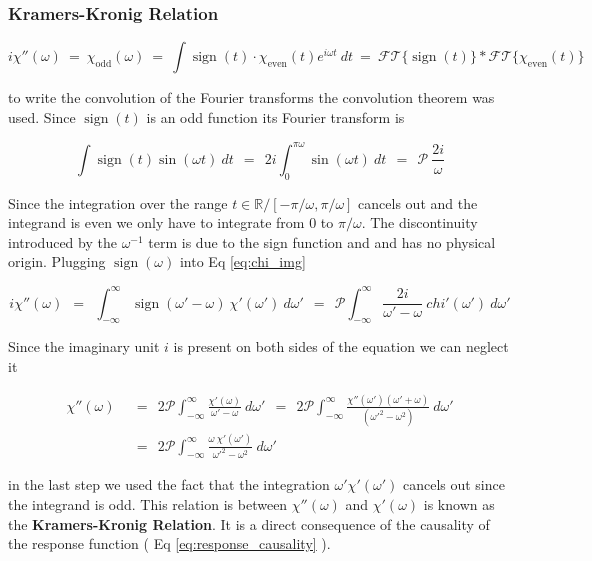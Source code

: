 \documentclass[10pt]{report}
\numberwithin{equation}{chapter}
\newcommand{\refEq}[1]{
  Eq  \ref{#1}
}
\DeclareMathOperator{\sign}{sign}
\newcommand{\FT}[1]{	%
  \mathcal{FT}\{ #1 \}
}
\newcommand{\princVal}{  %
  \mathcal{P}
}
\begin{document}
\subsubsection{Kramers-Kronig Relation}

\begin{equation} \label{eq:chi_img}
  i \chi''(\omega) ~=~ \chi_\text{odd}(\omega) ~=~ \int \sign(t) \cdot \chi_\text{even}(t) e^{i\omega t}\ dt ~=~ \FT{\sign(t)} \ast \FT{\chi_\text{even}(t)}
\end{equation}

to write the convolution of the Fourier transforms the convolution theorem was used. Since $\sign(t)$ is an odd function its Fourier transform is

\begin{equation}
  \int \sign(t) \sin(\omega t)\ dt ~~=~~ 2i \int^{\pi \omega}_0 \sin(\omega t)\ dt ~~=~~ \princVal\ \frac{2i}{\omega}
\end{equation}

Since the integration over the range $t \in \mathbb{R}/[-\pi/\omega, \pi/\omega]$  cancels out and the integrand is even we only have to integrate from $0$ to $\pi/\omega$. 
The discontinuity introduced by the $\omega^{-1}$ term is due to the sign function and and has no physical origin. Plugging $\sign(\omega)$ into \refEq{eq:chi_img}

\begin{equation}
  i \chi''(\omega) ~~=~~ \int_{-\infty}^\infty \sign(\omega' - \omega)\ \chi'(\omega')\ d\omega' ~~=~~
  \princVal \int_{-\infty}^\infty \frac{2i}{\omega' - \omega}\ chi'(\omega')\ d\omega'
\end{equation}

Since the imaginary unit $i$ is present on both sides of the equation we can neglect it 

\begin{align}
  \chi''(\omega) ~~& =~~ 2 \princVal \int_{-\infty}^\infty \frac{\chi'(\omega)}{\omega' - \omega}\ d\omega'
  ~~=~~ 2\princVal \int_{-\infty}^\infty \frac{\chi''(\omega')(\omega' + \omega)}{(\omega'^2 - \omega^2)}\ d\omega' \nonumber \\
  ~~& =~~ 2\princVal \int_{-\infty}^\infty \frac{\omega\ \chi'(\omega')}{\omega'^2-\omega^2}\ d\omega'
\end{align}

in the last step we used the fact that the integration $\omega' \chi'(\omega')$ cancels out since the integrand is odd. This relation is between $\chi''(\omega)$ and $\chi'(\omega)$ is known as the \textbf{Kramers-Kronig Relation}. It is a direct consequence of the causality of the response function (\refEq{eq:response_causality}). 
\end{document}

